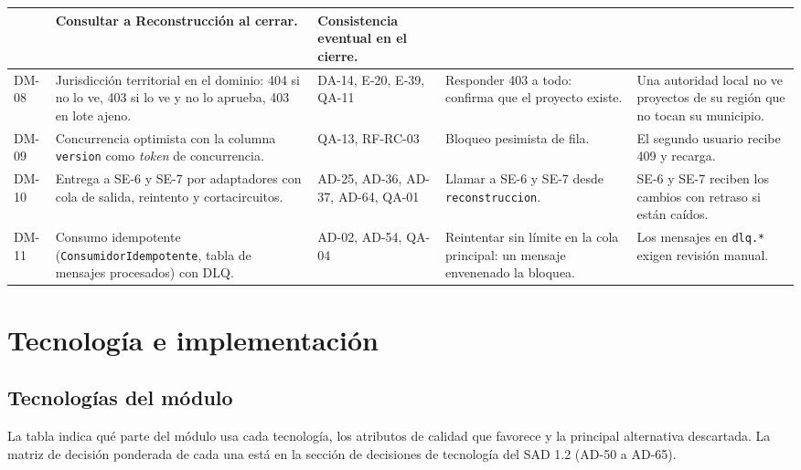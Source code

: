 \documentclass[11pt,a4paper]{article}
\begin{document}
{\begin{longtable}{|P{1.1cm}|P{3.6cm}|P{2.4cm}|P{3.4cm}|P{3.6cm}|}
    & Consultar a Reconstrucción al cerrar.
    & Consistencia eventual en el cierre. \\ \hline
  DM-08 & Jurisdicción territorial en el dominio: 404 si no lo ve, 403 si lo ve y no lo aprueba, 403 en lote ajeno.
    & DA-14, E-20, E-39, QA-11
    & Responder 403 a todo: confirma que el proyecto existe.
    & Una autoridad local no ve proyectos de su región que no tocan su municipio. \\ \hline
  DM-09 & Concurrencia optimista con la columna \texttt{version} como \emph{token} de concurrencia. & QA-13, RF-RC-03
    & Bloqueo pesimista de fila.
    & El segundo usuario recibe 409 y recarga. \\ \hline
  DM-10 & Entrega a SE-6 y SE-7 por adaptadores con cola de salida, reintento y cortacircuitos. & AD-25, AD-36,
    AD-37, AD-64, QA-01
    & Llamar a SE-6 y SE-7 desde \texttt{reconstruccion}.
    & SE-6 y SE-7 reciben los cambios con retraso si están caídos. \\ \hline
  DM-11 & Consumo idempotente (\texttt{Consumidor\allowbreak Idempotente}, tabla de mensajes procesados) con DLQ. & AD-02,
    AD-54, QA-04
    & Reintentar sin límite en la cola principal: un mensaje envenenado la bloquea.
    & Los mensajes en \texttt{dlq.*} exigen revisión manual. \\ \hline
\end{longtable}
}

\section{Tecnología e implementación}
\label{sec:tecnologias}

\subsection{Tecnologías del módulo}

La tabla indica qué parte del módulo usa cada tecnología, los atributos de calidad que favorece y la principal
alternativa descartada. La matriz de decisión ponderada de cada una está en la sección de decisiones de tecnología del
SAD 1.2 (AD-50 a AD-65).
\end{document}
